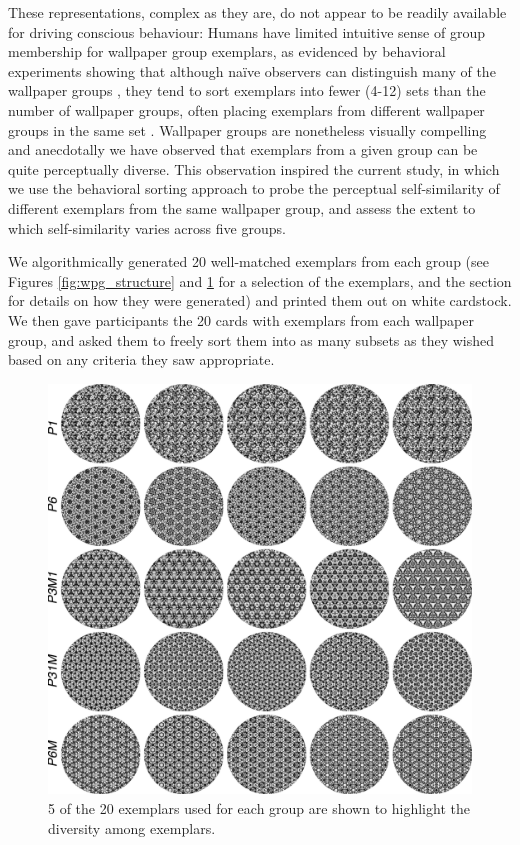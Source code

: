 \documentclass[11pt, twoside]{article}
\begin{document}
These representations, complex as they are, do not appear to be readily available for driving conscious behaviour: Humans have limited intuitive sense of group membership for wallpaper group exemplars, as evidenced by behavioral experiments showing that although naïve observers can distinguish many of the wallpaper groups \citep{RN1253}, they tend to sort exemplars into fewer (4-12) sets than the number of wallpaper groups, often placing exemplars from different wallpaper groups in the same set \citep{RN172}. Wallpaper groups are nonetheless visually compelling and anecdotally we have observed that exemplars from a given group can be quite perceptually diverse. This observation inspired the current study, in which we use the behavioral sorting approach to probe the perceptual self-similarity of different exemplars from the same wallpaper group, and assess the extent to which self-similarity varies across five groups. 

We algorithmically generated 20 well-matched exemplars from each group (see Figures \ref{fig:wpg_structure} and \ref{fig:wpg_exemplars} for a selection of the exemplars, and the  section for details on how they were generated) and printed them out on white cardstock. We then gave participants the 20 cards with exemplars from each wallpaper group, and asked them to freely sort them into as many subsets as they wished based on any criteria they saw appropriate.

\begin{figure}[H]
	\centering
	\includegraphics[width=\linewidth]{./figures//wpg_exemplars.pdf}
	\caption{5 of the 20 exemplars used for each group are shown to highlight the diversity among exemplars.}
	\label{fig:wpg_exemplars}
\end{figure}
\end{document}
